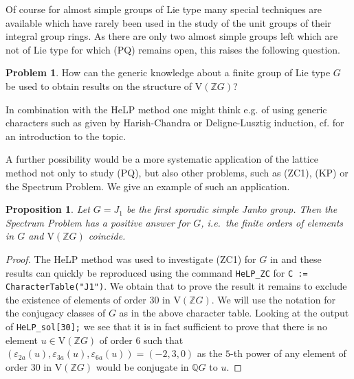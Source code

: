 \documentclass[10pt,a4paper,reqno]{amsart}
\newtheorem{proposition}[theorem]{Proposition}
\theoremstyle{definition}
\newtheorem{problem}[theorem]{Problem}
\theoremstyle{remark}
\newcommand{\V}{\mathrm{V}}
\newcommand{\ZZ}{\mathbb{Z}}
\newcommand{\QQ}{\mathbb{Q}}
\begin{document}
{Of course for almost simple groups of Lie type many special techniques are available which have rarely been used in the study of the unit groups of their integral group rings. As there are only two almost simple groups left which are not of Lie type for which (PQ) remains open, this raises the following question.

\begin{problem} How can the generic knowledge about a finite group of Lie type $G$ be used to obtain results on the structure of $\V(\ZZ G)$?\end{problem}

In combination with the HeLP method one might think e.g. of using generic characters such as given by Harish-Chandra or Deligne-Lusztig induction, cf. \cite{DM91} for an introduction to the topic. 

A further possibility would be a more systematic application of the lattice method not only to study (PQ), but also other problems, such as (ZC1), (KP) or the Spectrum Problem. We give an example of such an application.

\begin{proposition}
Let $G=J_1$ be the first sporadic simple Janko group. Then the Spectrum Problem has a positive answer for $G$, i.e.\ the finite orders of elements in $G$ and $\V(\ZZ G)$ coincide.
\end{proposition}

\begin{proof}
The HeLP method was used to investigate (ZC1) for $G$ in \cite{BJK11} and these results can quickly be reproduced using the command \texttt{HeLP\_ZC} for \texttt{C := CharacterTable("J1")}. We obtain that to prove the result it remains to exclude the existence of elements of order $30$ in $\V(\ZZ G)$. We will use the notation for the conjugacy classes of $G$ as in the above character table. Looking at the output of \texttt{HeLP\_sol[30];} we see that it is in fact sufficient to prove that there is no element $u \in \V(\ZZ G)$ of order $6$ such that $(\varepsilon_{2a}(u), \varepsilon_{3a}(u), \varepsilon_{6a}(u)) = (-2,3,0)$ as the $5$-th power of any element of order 30 in $\V(\ZZ G)$ would be conjugate in $\QQ G$ to $u$.


\end{proof}}
\end{document}
